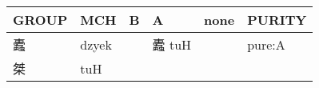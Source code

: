 \documentclass[14pt,a4paper]{scrartcl}
\begin{document}
\begin{longtable}[c]{@{}llllll@{}}
\toprule
\begin{minipage}[b]{0.14\columnwidth}\raggedright\strut
GROUP
\strut\end{minipage} &
\begin{minipage}[b]{0.14\columnwidth}\raggedright\strut
MCH
\strut\end{minipage} &
\begin{minipage}[b]{0.14\columnwidth}\raggedright\strut
B
\strut\end{minipage} &
\begin{minipage}[b]{0.14\columnwidth}\raggedright\strut
A
\strut\end{minipage} &
\begin{minipage}[b]{0.14\columnwidth}\raggedright\strut
none
\strut\end{minipage} &
\begin{minipage}[b]{0.14\columnwidth}\raggedright\strut
PURITY
\strut\end{minipage}\tabularnewline
\midrule
\endhead
\begin{minipage}[t]{0.14\columnwidth}\raggedright\strut
蠹
\strut\end{minipage} &
\begin{minipage}[t]{0.14\columnwidth}\raggedright\strut
dzyek
\strut\end{minipage} &
\begin{minipage}[t]{0.14\columnwidth}\raggedright\strut
\strut\end{minipage} &
\begin{minipage}[t]{0.14\columnwidth}\raggedright\strut
蠹 tuH
\strut\end{minipage} &
\begin{minipage}[t]{0.14\columnwidth}\raggedright\strut
\strut\end{minipage} &
\begin{minipage}[t]{0.14\columnwidth}\raggedright\strut
pure:A
\strut\end{minipage}\tabularnewline
\begin{minipage}[t]{0.14\columnwidth}\raggedright\strut
桀
\strut\end{minipage} &
\begin{minipage}[t]{0.14\columnwidth}\raggedright\strut
tuH
\strut\end{minipage} &
\begin{minipage}[t]{0.14\columnwidth}\raggedright\strut
\strut\end{minipage} &
\begin{minipage}[t]{0.14\columnwidth}\raggedright\strut

\end{minipage}
\end{longtable}
\end{document}
